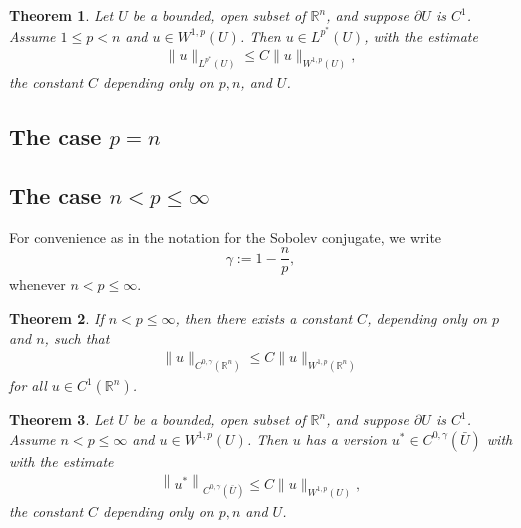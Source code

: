 \documentclass[a4paper,11pt]{article}
\newtheorem{theorem}{Theorem}[section]
\theoremstyle{definition}
\begin{document}
\begin{theorem}  
    Let $U$ be a bounded, open subset of $\mathbb{R}^n$, and suppose $\partial U$ is $C^1$. 
    Assume $1 \leq p < n$ and $u \in W^{1, p}(U)$. 
    Then $u \in L^{p^*}(U)$, with the estimate
    \begin{align*}
    \|u\|_{L^{p^*}(U)} \leq C\|u\|_{W^{1, p}(U)},
    \end{align*}
    the constant $C$ depending only on $p, n$, and $U$.
\end{theorem}

\subsection{The case $p=n$}

\subsection{The case $n < p \leq \infty$}

For convenience as in the notation for the Sobolev conjugate, we write 
\begin{equation*} 
    \gamma:=1- \frac{n}{p},
\end{equation*}
whenever $n < p \leq \infty$.

\begin{theorem}
    If $n < p \leq \infty$, then there exists a constant $C$, depending only on $p$ and $n$, such that
    \begin{align*}
    \|u\|_{C^{0, \gamma}\left(\mathbb{R}^n\right)} \leq C\|u\|_{W^{1, p}\left(\mathbb{R}^n\right)}
    \end{align*}
    for all $u \in C^1\left(\mathbb{R}^n\right)$.
\end{theorem}

\begin{theorem}
    Let $U$ be a bounded, open subset of $\mathbb{R}^n$, and suppose $\partial U$ is $C^1$. Assume $n < p \leq \infty$ and $u \in W^{1, p}(U)$. 
    Then $u$ has a version $u^{\ast} \in C^{0, \gamma}(\bar{U})$ with with the estimate
    \begin{align*}
        \left\|u^*\right\|_{C^{0, \gamma}(\bar{U})} \leq C\|u\|_{W^{1, p}(U)},
    \end{align*}
    the constant $C$ depending only on $p, n$ and $U$.
\end{theorem}
\end{document}
